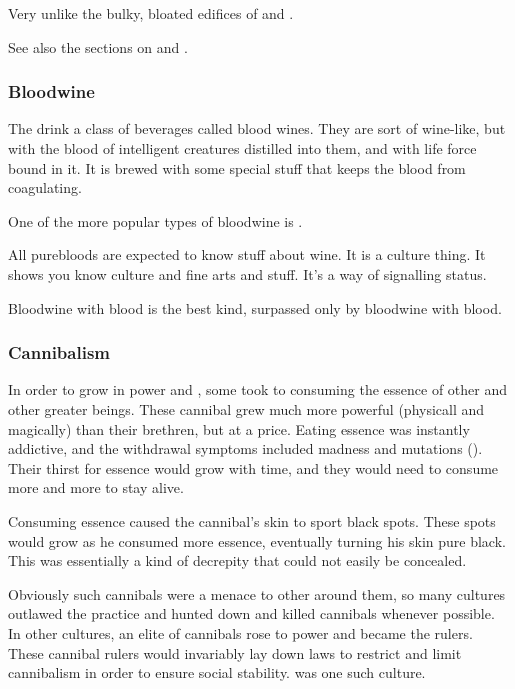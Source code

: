 Very unlike the bulky, bloated edifices of  and . 

See also the sections on  and . 





\subsubsection{Bloodwine}
The \resphain{} drink a class of beverages called blood wines. 
They are sort of wine-like, but with the blood of intelligent creatures distilled into them, and with life force bound in it. 
It is brewed with some special stuff that keeps the blood from coagulating. 

One of the more popular types of bloodwine is \ethylshe. 

All \resphan{} purebloods are expected to know stuff about wine. 
It is a culture thing. 
It shows you know culture and fine arts and stuff. 
It's a way of signalling status. 

Bloodwine with \resphan{} blood is the best kind, surpassed only by bloodwine with \draconic{} blood. 





\subsubsection{Cannibalism}
In order to grow in power and , some \resphain took to consuming the essence of other \resphain and other greater beings. 
These cannibal \resphain grew much more powerful (physicall and magically) than their brethren, but at a price. 
Eating \resphan essence was instantly addictive, and the withdrawal symptoms included madness and mutations (). 
Their thirst for essence would grow with time, and they would need to consume more and more \resphain to stay alive. 

Consuming \resphan essence caused the cannibal's skin to sport black spots. 
These spots would grow as he consumed more essence, eventually turning his skin pure black. 
This was essentially a kind of decrepity that could not easily be concealed. 

Obviously such cannibals were a menace to other \resphain around them, so many \resphan cultures outlawed the practice and hunted down and killed cannibals whenever possible. 
In other cultures, an elite of cannibals rose to power and became the rulers. 
These cannibal rulers would invariably lay down laws to restrict and limit cannibalism in order to ensure social stability. 
\Mystraacht was one such culture. 

